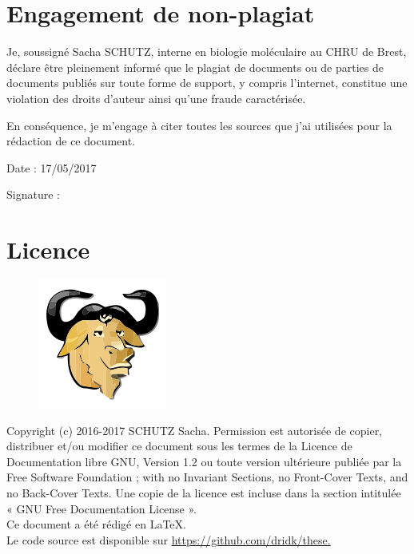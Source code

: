 \documentclass[12pt,a4paper]{article}
\begin{document}
\thispagestyle{empty}
\null
\newpage
\newpage
\thispagestyle{empty}
\setcounter{page}{0}
\thispagestyle{empty}
\section*{Engagement de non-plagiat}

Je, soussigné Sacha SCHUTZ, interne en biologie moléculaire au CHRU de Brest, déclare être pleinement informé que le plagiat de
documents ou de parties de documents publiés sur toute forme de
support, y compris l'internet, constitue une violation des droits
d'auteur ainsi qu'une fraude caractérisée.

En conséquence, je m'engage à citer toutes les sources que j'ai
utilisées pour la rédaction de ce document.

Date : 17/05/2017

\vspace{0.5cm}

Signature : \\
\vspace{0.5cm}



\vfill

\section*{Licence}

\begin{figure}
\includegraphics[scale=0.5]{img/gfdl.png}\hfill
\end{figure}

Copyright (c) 2016-2017 SCHUTZ Sacha. Permission est autorisée de copier,
distribuer et/ou modifier ce document sous les termes de la Licence de
Documentation libre GNU, Version 1.2 ou toute version ultérieure publiée
par la Free Software Foundation ; with no Invariant Sections, no
Front-Cover Texts, and no Back-Cover Texts. Une copie de la licence est
incluse dans la section intitulée « GNU Free Documentation License ». \\[1cm]
Ce document a été rédigé en \LaTeX.\\ Le code source est disponible sur \url{https://github.com/dridk/these.}
\end{document}
